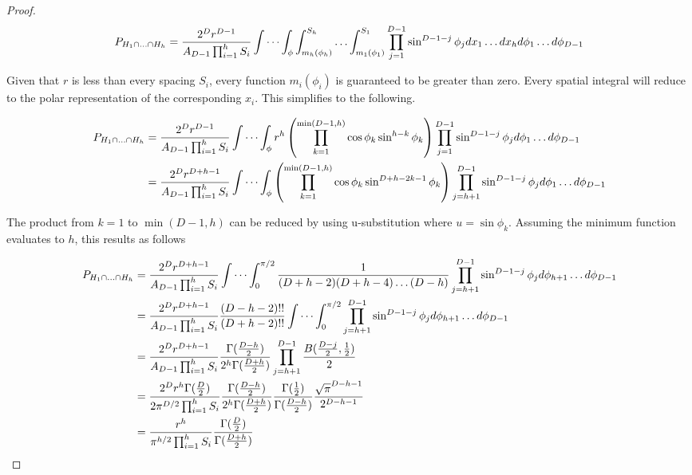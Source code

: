 \documentclass{article}
\begin{document}
\begin{proof}
	\begin{equation}
		P_{H_1\cap\hdots\cap H_h} = \frac{2^Dr^{D-1}}{A_{D-1}\prod_{i=1}^h S_i} \idotsint_\phi  \int_{m_h(\phi_h)}^{S_h} \hdots \int_{m_1(\phi_1)}^{S_1} \prod_{j=1}^{D-1}\sin^{D-1-j}\phi_j dx_1\hdots dx_h d\phi_1 \hdots d\phi_{D-1}
	\end{equation}

	Given that $r$ is less than every spacing $S_i$, every function $m_i(\phi_i)$ is guaranteed
	to be greater than zero. Every spatial integral will reduce to the polar representation of
	the corresponding $x_i$. This simplifies to the following.

	\begin{align}
		P_{H_1\cap\hdots\cap H_h} &= \frac{2^Dr^{D-1}}{A_{D-1}\prod_{i=1}^h S_i} \idotsint_\phi r^h \left( \prod_{k=1}^{\min(D-1, h)} \cos\phi_k\sin^{h-k}\phi_k\right) \prod_{j=1}^{D-1}\sin^{D-1-j}\phi_j d\phi_1 \hdots d\phi_{D-1} \\
		&= \frac{2^Dr^{D+h-1}}{A_{D-1}\prod_{i=1}^h S_i} \idotsint_\phi \left( \prod_{k=1}^{\min(D-1, h)} \cos\phi_k\sin^{D+h-2k-1}\phi_k\right) \prod_{j=h+1}^{D-1}\sin^{D-1-j}\phi_j d\phi_1 \hdots d\phi_{D-1}
	\end{align}

	The product from $k=1$ to $\min(D-1,h)$ can be reduced by using u-substitution where 
	$u=\sin\phi_k$. Assuming the minimum function evaluates to $h$, this results as follows

	\begin{align}
		P_{H_1\cap\hdots\cap H_h} &= \frac{2^Dr^{D+h-1}}{A_{D-1}\prod_{i=1}^h S_i} \idotsint_0^{\pi/2} \frac{1}{(D+h-2)(D+h-4)\hdots(D-h)} \prod_{j=h+1}^{D-1}\sin^{D-1-j}\phi_j d\phi_{h+1} \hdots d\phi_{D-1} \\
		&= \frac{2^Dr^{D+h-1}}{A_{D-1}\prod_{i=1}^h S_i} \frac{(D-h-2)!!}{(D+h-2)!!} \idotsint_0^{\pi/2} \prod_{j=h+1}^{D-1}\sin^{D-1-j}\phi_j d\phi_{h+1} \hdots d\phi_{D-1} \\
		&= \frac{2^Dr^{D+h-1}}{A_{D-1}\prod_{i=1}^h S_i} \frac{\Gamma(\frac{D-h}{2})}{2^h \Gamma(\frac{D+h}{2})} \prod_{j=h+1}^{D-1}\frac{B(\frac{D-j}{2}, \frac{1}{2})}{2} \\
		&= \frac{2^Dr^{h}\Gamma(\frac{D}{2})}{2 \pi^{D/2}\prod_{i=1}^h S_i} \frac{\Gamma(\frac{D-h}{2})}{2^h \Gamma(\frac{D+h}{2})} \frac{\Gamma(\frac{1}{2})}{\Gamma(\frac{D-h}{2})} \frac{\sqrt{\pi}^{D-h-1}}{2^{D-h-1}} \\
		&= \frac{r^{h}}{\pi^{h/2}\prod_{i=1}^h S_i} \frac{\Gamma(\frac{D}{2})}{\Gamma(\frac{D+h}{2})} \\
	\end{align}


\end{proof}
\end{document}
